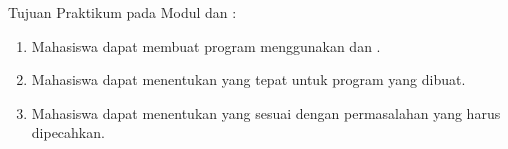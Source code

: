 \documentclass[../main.tex]{subfiles}
\begin{document}
    \noindent Tujuan Praktikum pada Modul {} {\Statement} {\Control} dan {\Looping}:
    \begin{enumerate}
        \item Mahasiswa dapat membuat program menggunakan {\statement} {\control} dan {\looping}.
        \item Mahasiswa dapat menentukan {\statement} {\control} yang tepat untuk program yang dibuat.
        \item Mahasiswa dapat menentukan {\statement} {\looping} yang sesuai dengan permasalahan yang harus dipecahkan.
    \end{enumerate}
\end{document}
